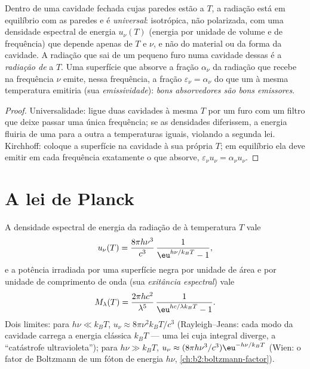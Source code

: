 \begin{proposition}\label{prop:b2:thermal-radiation:kirchhoff}
Dentro de uma cavidade fechada cujas paredes estão a $T$, a radiação está em
equilíbrio com as paredes e é \emph{universal}: isotrópica,
não polarizada, com uma densidade espectral de energia $u_\nu(T)$ (energia por unidade
de volume e de frequência) que depende apenas de $T$ e $\nu$, e não do
material ou da forma da cavidade. A radiação que sai de um pequeno furo
numa cavidade dessas é a \emph{radiação de } a $T$. Uma superfície que
absorve a fração $\alpha_\nu$ da radiação que recebe na
frequência $\nu$ emite, nessa frequência, a fração
$\varepsilon_\nu = \alpha_\nu$ do que um  à mesma
temperatura emitiria (sua \emph{emissividade}):
\emph{bons absorvedores são bons emissores}.
\end{proposition}

\begin{proof}
Universalidade: ligue duas cavidades à mesma $T$ por um furo com um
filtro que deixe passar uma única frequência; se as densidades diferissem, a energia
fluiria de uma para a outra a temperaturas iguais, violando a segunda
lei. Kirchhoff: coloque a superfície na cavidade à sua própria $T$; em
equilíbrio ela deve emitir em cada frequência exatamente o que absorve,
$\varepsilon_\nu u_\nu = \alpha_\nu u_\nu$.
\end{proof}

\section{A lei de Planck}

\begin{theorem}\label{thm:b2:thermal-radiation:planck}
A densidade espectral de energia da radiação de  à temperatura
$T$ vale
\[
u_\nu(T) = \frac{8\pi h\nu^3}{c^3}\,\frac{1}{\eu^{h\nu/k_BT} - 1},
\]
e a potência irradiada por uma superfície negra por unidade de área e por unidade
de comprimento de onda (sua \emph{exitância espectral}) vale
\[
M_\lambda(T) = \frac{2\pi hc^2}{\lambda^5}\,\frac{1}{\eu^{hc/\lambda k_BT} - 1}.
\]
Dois limites: para $h\nu \ll k_BT$, $u_\nu \approx 8\pi\nu^2 k_BT/c^3$
(Rayleigh--Jeans: cada modo da cavidade carrega a energia clássica
$k_BT$ --- uma lei cuja integral diverge, a ``catástrofe
ultravioleta''); para $h\nu \gg k_BT$, $u_\nu \approx (8\pi h\nu^3/c^3)
\eu^{-h\nu/k_BT}$ (Wien: o fator de Boltzmann de um fóton de energia
$h\nu$, \cref{ch:b2:boltzmann-factor}).
\end{theorem}

